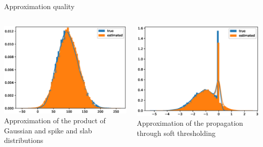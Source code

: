 \documentclass[9pt]{beamer}
\begin{document}
\begin{frame}{Approximation quality}
    \begin{columns}
      \begin{column}{0.5\textwidth}
       \centering
       \includegraphics[width=\columnwidth]{graphics/d_testing}\\
       Approximation of the \newline product of Gaussian and spike and slab distributions
      \end{column}
            \begin{column}{0.5\textwidth}
      \centering
      \includegraphics[width=\columnwidth]{graphics/z_new_testing}\\
      Approximation of the propagation through soft thresholding
      \end{column}
      \end{columns}

\end{frame}
\end{document}
